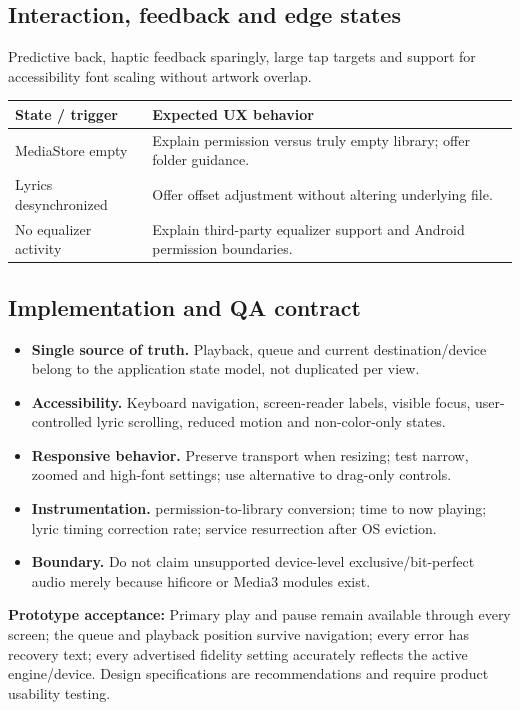 \documentclass[10pt,a4paper,oneside]{report}
\begin{document}
\subsection*{Interaction, feedback and edge states}
Predictive back, haptic feedback sparingly, large tap targets and support for accessibility font scaling without artwork overlap.\par
\begin{tabularx}{\linewidth}{@{}p{39mm}X@{}}\toprule State / trigger & Expected UX behavior\\\midrule
MediaStore empty & Explain permission versus truly empty library; offer folder guidance.\\
Lyrics desynchronized & Offer offset adjustment without altering underlying file.\\
No equalizer activity & Explain third-party equalizer support and Android permission boundaries.\\
\bottomrule\end{tabularx}
\subsection*{Implementation and QA contract}
\begin{itemize}[leftmargin=*,itemsep=2pt,topsep=2pt]
\item \textbf{Single source of truth.} Playback, queue and current destination/device belong to the application state model, not duplicated per view.
\item \textbf{Accessibility.} Keyboard navigation, screen-reader labels, visible focus, user-controlled lyric scrolling, reduced motion and non-color-only states.
\item \textbf{Responsive behavior.} Preserve transport when resizing; test narrow, zoomed and high-font settings; use alternative to drag-only controls.
\item \textbf{Instrumentation.} permission-to-library conversion; time to now playing; lyric timing correction rate; service resurrection after OS eviction.
\item \textbf{Boundary.} Do not claim unsupported device-level exclusive/bit-perfect audio merely because hificore or Media3 modules exist.
\end{itemize}
\vspace{2mm}\begin{evidencebox}\small\textbf{Prototype acceptance:} Primary play and pause remain available through every screen; the queue and playback position survive navigation; every error has recovery text; every advertised fidelity setting accurately reflects the active engine/device. Design specifications are recommendations and require product usability testing.\end{evidencebox}
\clearpage
\end{document}
